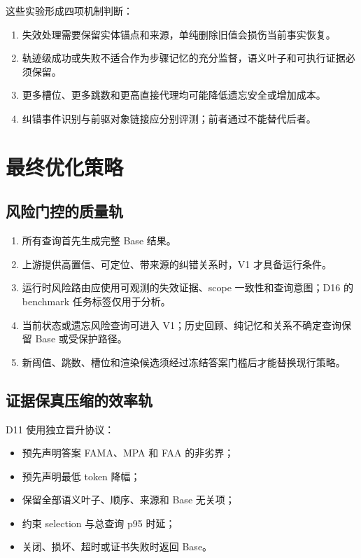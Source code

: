 这些实验形成四项机制判断：

\begin{enumerate}
\item 失效处理需要保留实体锚点和来源，单纯删除旧值会损伤当前事实恢复。
\item 轨迹级成功或失败不适合作为步骤记忆的充分监督，语义叶子和可执行证据必须保留。
\item 更多槽位、更多跳数和更高直接代理均可能降低遗忘安全或增加成本。
\item 纠错事件识别与前驱对象链接应分别评测；前者通过不能替代后者。
\end{enumerate}

\section{最终优化策略}

\subsection{风险门控的质量轨}

\begin{enumerate}
\item 所有查询首先生成完整 Base 结果。
\item 上游提供高置信、可定位、带来源的纠错关系时，V1 才具备运行条件。
\item 运行时风险路由应使用可观测的失效证据、scope 一致性和查询意图；D16 的 benchmark 任务标签仅用于分析。
\item 当前状态或遗忘风险查询可进入 V1；历史回顾、纯记忆和关系不确定查询保留 Base 或受保护路径。
\item 新阈值、跳数、槽位和渲染候选须经过冻结答案门槛后才能替换现行策略。
\end{enumerate}

\subsection{证据保真压缩的效率轨}

D11 使用独立晋升协议：

\begin{itemize}
\item 预先声明答案 FAMA、MPA 和 FAA 的非劣界；
\item 预先声明最低 token 降幅；
\item 保留全部语义叶子、顺序、来源和 Base 无关项；
\item 约束 selection 与总查询 p95 时延；
\item 关闭、损坏、超时或证书失败时返回 Base。
\end{itemize}


